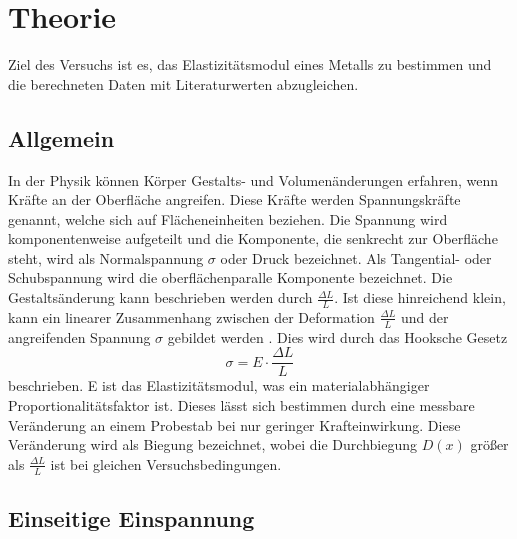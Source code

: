 \section{Theorie}
\label{sec:Theorie}

Ziel des Versuchs ist es, das Elastizitätsmodul eines Metalls zu bestimmen und die berechneten Daten mit Literaturwerten abzugleichen.


\subsection{Allgemein}
In der Physik können Körper Gestalts- und Volumenänderungen erfahren, wenn Kräfte an der Oberfläche angreifen. Diese Kräfte werden Spannungskräfte genannt, welche sich auf Flächeneinheiten beziehen.
Die Spannung wird komponentenweise aufgeteilt und die Komponente, die senkrecht zur Oberfläche steht, wird als Normalspannung $\sigma$ oder Druck bezeichnet.
Als Tangential- oder Schubspannung wird die oberflächenparalle Komponente bezeichnet.
Die Gestaltsänderung kann beschrieben werden durch $\frac{\Delta L}{L}$. 
Ist diese hinreichend klein, kann ein linearer Zusammenhang zwischen der Deformation $\frac{\Delta L}{L}$ und der angreifenden Spannung $\sigma$ gebildet werden \cite[106]{V103}.  Dies wird durch das Hooksche Gesetz
\begin{equation}
  \sigma = E \cdot \frac{\Delta L}{L}
  \label{eqn:Hook}
\end{equation}
beschrieben.
E ist das Elastizitätsmodul, was ein materialabhängiger Proportionalitätsfaktor ist.
Dieses lässt sich bestimmen durch eine messbare Veränderung an einem Probestab bei nur geringer Krafteinwirkung. 
Diese Veränderung wird als Biegung bezeichnet, wobei die Durchbiegung $D(x)$ größer als $\frac{\Delta L}{L}$ ist bei gleichen Versuchsbedingungen.


\subsection{Einseitige Einspannung}

